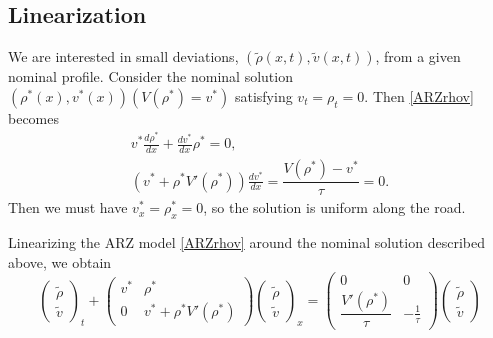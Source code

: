 \documentclass[preprint]{elsarticle}
\begin{document}
\subsection{Linearization}
We are interested in small deviations, $(\tilde{\rho}(x,t), \tilde{v}(x,t))$, from a given nominal profile. Consider the nominal solution $(\rho^*(x),v^*(x))(V(\rho^*) = v^*)$ satisfying $v_t = \rho_t = 0$. Then \eqref{ARZrhov} becomes
\begin{align}
v^* \frac{d\rho^*}{dx} + \frac{dv^*}{dx}\rho^* = 0, \\
\left( v^* + \rho^* V'( \rho^*) \right)\frac{dv^*}{dx} = \dfrac{V(\rho^*) - v^*}{\tau} = 0.
\end{align}
Then we must have $v^*_x=\rho^*_x=0$, so the solution is uniform along the road. 

Linearizing the ARZ model \eqref{ARZrhov} around the nominal solution described above, we obtain
\begin{equation} \label{rhovlin}
\begin{pmatrix}
\tilde{\rho} \\ \tilde{v}
\end{pmatrix}_t
+ \begin{pmatrix}
v^* & \rho^* \\
0 & v^* + \rho^* V' ( \rho^*) 
\end{pmatrix}
\begin{pmatrix}
\tilde{\rho} \\ \tilde{v}
\end{pmatrix}_x = 
\begin{pmatrix}
0 & 0 \\
\dfrac{V' (\rho^*)}{\tau} & -\frac{1}{\tau}
\end{pmatrix}
\begin{pmatrix}
\tilde{\rho} \\ \tilde{v}
\end{pmatrix}
\end{equation}
\end{document}
